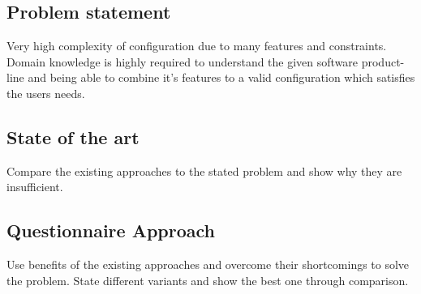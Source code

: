 \subsection{Problem statement}
Very high complexity of configuration due to many features and constraints. Domain knowledge is highly required to understand the given software product-line and being able to combine it's features to a valid configuration which satisfies the users needs.

\subsection{State of the art}
Compare the existing approaches to the stated problem and show why they are insufficient.

\subsection{Questionnaire Approach}
Use benefits of the existing approaches and overcome their shortcomings to solve the problem. State different variants and show the best one through comparison.